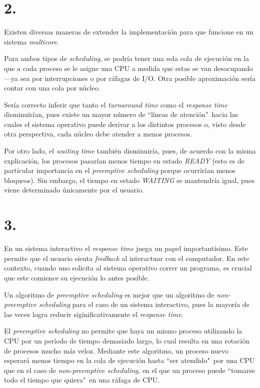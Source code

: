 \documentclass[12pt]{article}
\begin{document}
\section*{2.}

Existen diversas maneras de extender la implementación para que funcione en un sistema \textit{multicore}.

Para ambos tipos de \textit{scheduling}, se podría tener una sola cola de ejecución en la que a cada proceso se le asigne una CPU a medida que estas se van desocupando —ya sea por interrupciones o por ráfagas de I/O. Otra posible aproximación sería contar con una cola por núcleo.

Sería correcto inferir que tanto el \textit{turnaround time} como el \textit{response time} disminuirían, pues existe un mayor número de ``líneas de atención"\ hacia las cuales el sistema operativo puede derivar a los distintos procesos o, visto desde otra perspectiva, cada núcleo debe atender a menos procesos.

Por otro lado, el \textit{waiting time} también disminuiría, pues, de acuerdo con la misma explicación, los procesos pasarían menos tiempo en estado \textit{READY} (esto es de particular importancia en el \textit{preemptive scheduling} porque ocurrirían menos bloqueos). Sin embargo, el tiempo en estado \textit{WAITING} se mantendría igual, pues viene determinado únicamente por el usuario.

\section*{3.}

En un sistema interactivo el \textit{response time} juega un papel importantísimo. Este permite que el usuario sienta \textit{feedback} al interactuar con el computador. En este contexto, cuando uno solicita al sistema operativo correr un programa, es crucial que este comience su ejecución lo antes posible.

Un algoritmo de \textit{preemptive scheduling} es mejor que un algoritmo de \textit{non-preemptive scheduling} para el caso de un sistema interactivo, pues la mayoría de las veces logra reducir siginificativamente el \textit{response time}.

El \textit{preemptive scheduling} no permite que haya un mismo proceso utilizando la CPU por un período de tiempo demasiado largo, lo cual resulta en una rotación de procesos mucho más veloz. Mediante este algoritmo, un proceso nuevo esperará menos tiempo en la cola de ejecución hasta ``ser atendido"\ por una CPU que en el caso de \textit{non-preemptive scheduling}, en el que un proceso puede ``tomarse todo el tiempo que quiera"\ en una ráfaga de CPU.
\end{document}
